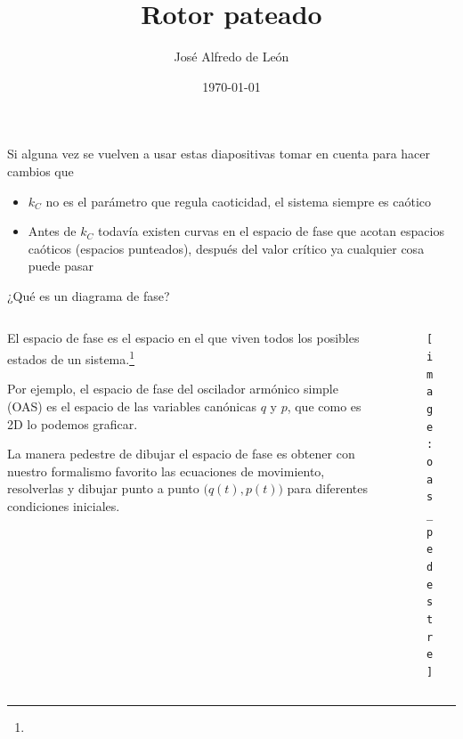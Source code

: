 \documentclass[aspectratio=169,xcolor=dvipsnames,7pt]{beamer}
\title[]{Rotor pateado}
\author[]{José Alfredo de León}
\institute[] %
{
}
\date{\large \today} %
\begin{document}
\begin{frame}
    \titlepage
    Si alguna vez se vuelven a usar estas diapositivas tomar en cuenta para hacer cambios que
    \begin{itemize}
    \item $k_C$ no es el parámetro que regula caoticidad, el sistema siempre es caótico
    \item Antes de $k_C$ todavía existen curvas en el espacio de fase que acotan espacios caóticos (espacios punteados), después del valor crítico ya cualquier cosa puede pasar
    \end{itemize}
\end{frame}


\begin{frame}{¿Qué es un diagrama de fase?}

\begin{columns}
\begin{column}{0.55\textwidth}  %
El espacio de fase es el espacio en el que viven todos los posibles estados
de un sistema.\footnote[frame]{}

\vspace*{.5cm}
Por ejemplo, el espacio de fase del oscilador armónico simple (OAS) 
es el espacio de las variables canónicas $q$ y $p$, que como es 2D lo podemos
graficar.

\vspace*{.5cm} 
La manera pedestre de dibujar el espacio de fase es obtener con nuestro
formalismo favorito las ecuaciones de movimiento, resolverlas y dibujar
punto a punto $\big(q(t),p(t)\big)$ para diferentes condiciones iniciales.
\end{column}

\hspace*{-1.5cm}
\begin{column}{0.4\textwidth}  %
\begin{figure}
\texttt{[image: oas\_pedestre]}
\end{figure}
\end{column}
\end{columns}
\end{frame}
\end{document}
